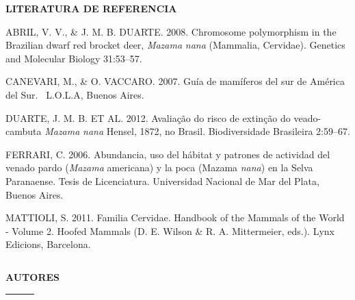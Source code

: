 \documentclass[
  x11names]{article}
\begin{document}
\noindent\textbf{LITERATURA DE REFERENCIA}

ABRIL, V. V., \& J. M. B. DUARTE. 2008. Chromosome polymorphism in the
Brazilian dwarf red brocket deer, \textit{Mazama} \textit{nana}
(Mammalia, Cervidae). Genetics and Molecular Biology 31:53--57.

CANEVARI, M., \& O. VACCARO. 2007. Guía de mamíferos del sur de América
del Sur.~ L.O.L.A, Buenos Aires.

DUARTE, J. M. B. ET AL. 2012. Avaliação do risco de extinção do
veado-cambuta \textit{Mazama} \textit{nana} Hensel, 1872, no Brasil.
Biodiversidade Brasileira 2:59--67.

FERRARI, C. 2006. Abundancia, uso del hábitat y patrones de actividad
del venado pardo (\textit{Mazama} americana) y la poca (Mazama
\textit{nana}) en la Selva Paranaense. Tesis de Licenciatura.
Universidad Nacional de Mar del Plata, Buenos Aires.

MATTIOLI, S. 2011. Familia Cervidae. Handbook of the Mammals of the
World - Volume 2. Hoofed Mammals (D. E. Wilson \& R. A. Mittermeier,
eds.). Lynx Edicions, Barcelona.

\setlength{\parindent}{0pt}

%
\begin{table}[H]
\centering
\begin{tabular}[t]{>{\raggedright\arraybackslash}m{16cm}>{}m{16cm}}
\toprule
\cellcolor{ceil}{\textcolor{white}{\textbf{\rule{0pt}{14pt}AUTORES}}}\\
\bottomrule
\end{tabular}
\end{table}

\vspace{-0.4cm}

\textbf{AUTORES}

\begin{longtabu} to 
\toprule
\textbf{} &  & \\
\bottomrule
\end{longtabu}
\end{document}
